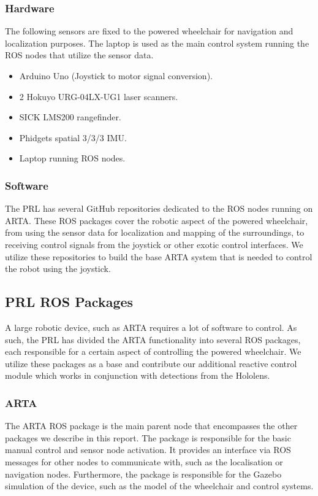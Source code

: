 \subsubsection{Hardware}
The following sensors are fixed to the powered wheelchair for navigation and localization purposes. The laptop is used as the main control system running the ROS nodes that utilize the sensor data. 

\begin{itemize}
    \item Arduino Uno (Joystick to motor signal conversion).
    \item 2 Hokuyo URG-04LX-UG1 laser scanners.
    \item SICK LMS200 rangefinder.
    \item Phidgets spatial 3/3/3 IMU.
    \item Laptop running ROS nodes.
\end{itemize}

\subsubsection{Software}
The PRL has several GitHub repositories dedicated to the ROS nodes running on ARTA. These ROS packages cover the robotic aspect of the powered wheelchair, from using the sensor data for localization and mapping of the surroundings, to receiving control signals from the joystick or other exotic control interfaces. We utilize these repositories to build the base ARTA system that is needed to control the robot using the joystick.

\subsection{PRL ROS Packages}
A large robotic device, such as ARTA requires a lot of software to control. As such, the PRL has divided the ARTA functionality into several ROS packages, each responsible for a certain aspect of controlling the powered wheelchair. We utilize these packages as a base and contribute our additional reactive control module which works in conjunction with detections from the Hololens.

\subsubsection{ARTA}
The ARTA ROS package is the main parent node that encompasses the other packages we describe in this report. The package is responsible for the basic manual control and sensor node activation. It provides an interface via ROS messages for other nodes to communicate with, such as the localisation or navigation nodes. Furthermore, the package is responsible for the Gazebo simulation of the device, such as the model of the wheelchair and control systems.

